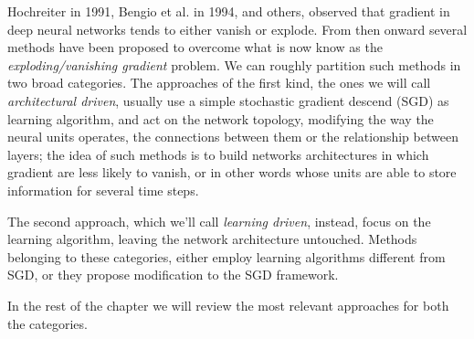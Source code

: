 
Hochreiter\cite{lstm} in 1991, Bengio et al.\cite{learningIsDifficult} in 1994, and others, observed that gradient in 
deep neural networks tends to either vanish or explode. From then onward several methods have been proposed to 
overcome what is now know as the \textit{exploding/vanishing gradient} problem. We can roughly partition such methods in 
two broad categories.
The approaches of the first kind, the ones we will call \textit{architectural driven}, usually use a simple stochastic gradient descend (SGD) as learning algorithm, and act on the network topology, modifying the way the 
neural units operates, the connections between them or the relationship between layers; the idea of such methods is to 
build networks architectures in which gradient are less likely to vanish, or in other words whose units are able to 
store information for several time steps.

The second approach, which we'll call \textit{learning driven}, instead, focus on the learning algorithm, leaving the 
network architecture untouched. Methods belonging to these categories, either employ learning algorithms different from 
SGD, or they propose modification to the SGD framework.


In the rest of the chapter we will review the most relevant approaches for both the categories.
